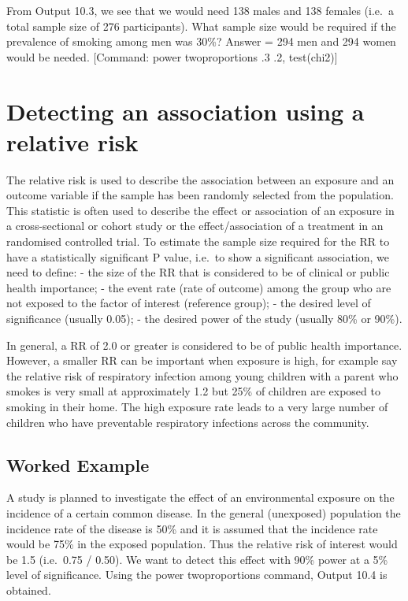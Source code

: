 \documentclass[
]{memoir}
\begin{document}
From Output 10.3, we see that we would need 138 males and 138 females (i.e.~a total sample size of 276 participants).
What sample size would be required if the prevalence of smoking among men was 30\%?
Answer = 294 men and 294 women would be needed.
{[}Command: power twoproportions .3 .2, test(chi2){]}

\hypertarget{detecting-an-association-using-a-relative-risk}{%
\section{Detecting an association using a relative risk}\label{detecting-an-association-using-a-relative-risk}}

The relative risk is used to describe the association between an exposure and an outcome variable if the sample has been randomly selected from the population. This statistic is often used to describe the effect or association of an exposure in a cross-sectional or cohort study or the effect/association of a treatment in an randomised controlled trial. To estimate the sample size required for the RR to have a statistically significant P value, i.e.~to show a significant association, we need to define:
- the size of the RR that is considered to be of clinical or public health importance;
- the event rate (rate of outcome) among the group who are not exposed to the factor of interest (reference group);
- the desired level of significance (usually 0.05);
- the desired power of the study (usually 80\% or 90\%).

In general, a RR of 2.0 or greater is considered to be of public health importance. However, a smaller RR can be important when exposure is high, for example say the relative risk of respiratory infection among young children with a parent who smokes is very small at approximately 1.2 but 25\% of children are exposed to smoking in their home. The high exposure rate leads to a very large number of children who have preventable respiratory infections across the community.

\hypertarget{worked-example-17}{%
\subsection{Worked Example}\label{worked-example-17}}

A study is planned to investigate the effect of an environmental exposure on the incidence of a certain common disease. In the general (unexposed) population the incidence rate of the disease is 50\% and it is assumed that the incidence rate would be 75\% in the exposed population. Thus the relative risk of interest would be 1.5 (i.e.~0.75 / 0.50). We want to detect this effect with 90\% power at a 5\% level of significance. Using the power twoproportions command, Output 10.4 is obtained.
\end{document}
